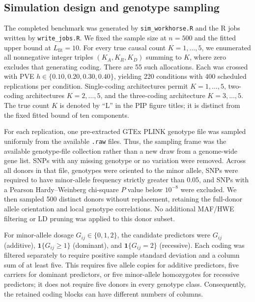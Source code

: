 \documentclass[12pt]{article}
\begin{document}
\subsection{Simulation design and genotype sampling}

The completed benchmark was generated by \texttt{sim\_workhorse.R} and
the R jobs written by \texttt{write\_jobs.R}. We fixed the sample size
at $n=500$ and the fitted upper bound at $L_{\mathrm{fit}}=10$.
For every true causal count $K=1,\ldots,5$, we enumerated all
nonnegative integer triples $(K_A,K_R,K_D)$ summing to $K$, where zero
excludes that generating coding. There are 55 such allocations. Each
was crossed with PVE $h\in\{0.10,0.20,0.30,0.40\}$, yielding 220
conditions with 400 scheduled replications per condition. Single-coding
architectures permit $K=1,\ldots,5$, two-coding architectures
$K=2,\ldots,5$, and the three-coding architecture $K=3,\ldots,5$.
The true count $K$ is denoted by ``L'' in the PIP figure titles; it is
distinct from the fixed fitted bound of ten components.

For each replication, one pre-extracted GTEx PLINK genotype file was
sampled uniformly from the available \texttt{.raw} files. Thus, the
sampling frame was the available genotype-file collection rather than
a new draw from a genome-wide gene list. SNPs with any missing
genotype or no variation were removed. Across all donors in that file,
genotypes were oriented to the minor allele, SNPs were required to
have minor-allele frequency strictly greater than 0.05, and SNPs with
a Pearson Hardy--Weinberg chi-square $P$ value below $10^{-8}$ were
excluded. We then sampled 500 distinct donors without replacement,
retaining the full-donor allele orientation and local genotype
correlations. No additional MAF/HWE filtering or LD pruning was applied
to this donor subset.

For minor-allele dosage $G_{ij}\in\{0,1,2\}$, the candidate predictors
were $G_{ij}$ (additive), $\mathbf{1}\{G_{ij}\geq1\}$ (dominant), and
$\mathbf{1}\{G_{ij}=2\}$ (recessive). Each coding was filtered separately
to require positive sample standard deviation and a column sum of at
least five. This requires five allele copies for additive predictors,
five carriers for dominant predictors, or five minor-allele homozygotes
for recessive predictors; it does not require five donors in every
genotype class. Consequently, the retained coding blocks can have
different numbers of columns.
\end{document}
